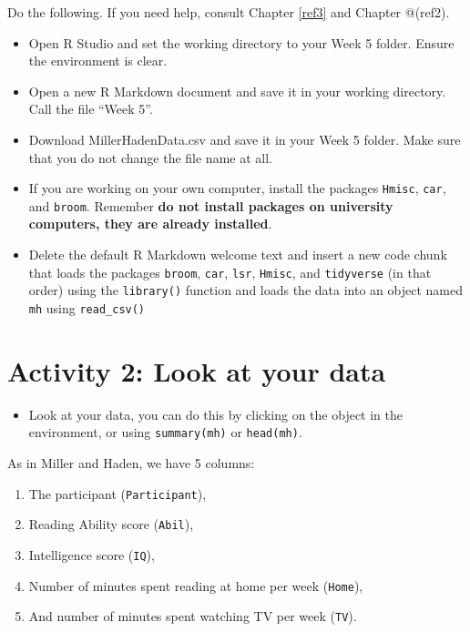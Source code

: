 \documentclass[]{book}
\providecommand{\tightlist}{%
  \setlength{\itemsep}{0pt}\setlength{\parskip}{0pt}}
\begin{document}
Do the following. If you need help, consult Chapter \ref{ref3} and Chapter @(ref2).

\begin{itemize}
\tightlist
\item
  Open R Studio and set the working directory to your Week 5 folder. Ensure the environment is clear.\\
\item
  Open a new R Markdown document and save it in your working directory. Call the file ``Week 5''.\\
\item
  Download MillerHadenData.csv and save it in your Week 5 folder. Make sure that you do not change the file name at all.\\
\item
  If you are working on your own computer, install the packages \texttt{Hmisc}, \texttt{car}, and \texttt{broom}. Remember \textbf{do not install packages on university computers, they are already installed}.
\item
  Delete the default R Markdown welcome text and insert a new code chunk that loads the packages \texttt{broom}, \texttt{car}, \texttt{lsr}, \texttt{Hmisc}, and \texttt{tidyverse} (in that order) using the \texttt{library()} function and loads the data into an object named \texttt{mh} using \texttt{read\_csv()}
\end{itemize}

\hypertarget{activity-2-look-at-your-data-1}{%
\section{Activity 2: Look at your data}\label{activity-2-look-at-your-data-1}}

\begin{itemize}
\tightlist
\item
  Look at your data, you can do this by clicking on the object in the environment, or using \texttt{summary(mh)} or \texttt{head(mh)}.
\end{itemize}

As in Miller and Haden, we have 5 columns:

\begin{enumerate}
\def\labelenumi{\arabic{enumi}.}
\tightlist
\item
  The participant (\texttt{Participant}),
\item
  Reading Ability score (\texttt{Abil}),
\item
  Intelligence score (\texttt{IQ}),
\item
  Number of minutes spent reading at home per week (\texttt{Home}),
\item
  And number of minutes spent watching TV per week (\texttt{TV}).
\end{enumerate}
\end{document}
